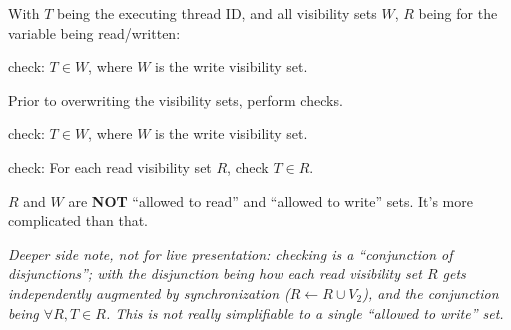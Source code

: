 \newpage
{}

\begin{minipage}[t]{0.7\textwidth}\fixminipage
With $T$ being the executing thread ID, and all visibility sets $W$, $R$ being for the variable being read/written:


 check: $T \in W$, where $W$ is the write visibility set.


Prior to overwriting the visibility sets, perform checks.

 check: $T \in W$, where $W$ is the write visibility set.

 check: For each read visibility set $R$, check $T \in R$.

\vspace{10mm}

 $R$ and $W$ are \textbf{NOT} ``allowed to read'' and ``allowed to write'' sets.
It's more complicated than that.

\vspace{10mm}

\textit{Deeper side note, not for live presentation:  checking is a ``conjunction of disjunctions''; with the disjunction being how each read visibility set $R$ gets independently augmented by synchronization ($R \leftarrow R \cup V_2$), and the conjunction being $\forall R, T \in R$.
This is not really simplifiable to a single ``allowed to write'' set.}
\end{minipage}

\newpage
{}

